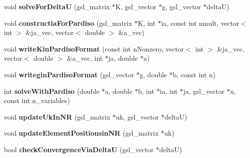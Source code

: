 \begin{DoxyCompactItemize}
\item 
\hypertarget{classSimulation_a23927524ed4ee666bb3f7845b8e5c34f}{}void {\bfseries solve\+For\+Delta\+U} (gsl\+\_\+matrix $\ast$K, gsl\+\_\+vector $\ast$g, gsl\+\_\+vector $\ast$delta\+U)\label{classSimulation_a23927524ed4ee666bb3f7845b8e5c34f}

\item 
\hypertarget{classSimulation_aac47a578fcfe5935eca3fbb9580dc5b0}{}void {\bfseries constructia\+For\+Pardiso} (gsl\+\_\+matrix $\ast$K, int $\ast$ia, const int nmult, vector$<$ int $>$ \&ja\+\_\+vec, vector$<$ double $>$ \&a\+\_\+vec)\label{classSimulation_aac47a578fcfe5935eca3fbb9580dc5b0}

\item 
\hypertarget{classSimulation_a0f0e358f99d5f4a286a464342ab11104}{}void {\bfseries write\+Kin\+Pardiso\+Format} (const int n\+Nonzero, vector$<$ int $>$ \&ja\+\_\+vec, vector$<$ double $>$ \&a\+\_\+vec, int $\ast$ja, double $\ast$a)\label{classSimulation_a0f0e358f99d5f4a286a464342ab11104}

\item 
\hypertarget{classSimulation_ad834b670e7fc5a7933d441d2278d622d}{}void {\bfseries writegin\+Pardiso\+Format} (gsl\+\_\+vector $\ast$g, double $\ast$b, const int n)\label{classSimulation_ad834b670e7fc5a7933d441d2278d622d}

\item 
\hypertarget{classSimulation_acb243ba7dd91cba4e63533ae9b5edd8a}{}int {\bfseries solve\+With\+Pardiso} (double $\ast$a, double $\ast$b, int $\ast$ia, int $\ast$ja, gsl\+\_\+vector $\ast$x, const int n\+\_\+variables)\label{classSimulation_acb243ba7dd91cba4e63533ae9b5edd8a}

\item 
\hypertarget{classSimulation_a938793b4f60eebdd88f7a3a9791819a0}{}void {\bfseries update\+Uk\+In\+N\+R} (gsl\+\_\+matrix $\ast$uk, gsl\+\_\+vector $\ast$delta\+U)\label{classSimulation_a938793b4f60eebdd88f7a3a9791819a0}

\item 
\hypertarget{classSimulation_aed6fc494b468ebd56c07625d3e5984ff}{}void {\bfseries update\+Element\+Positionsin\+N\+R} (gsl\+\_\+matrix $\ast$uk)\label{classSimulation_aed6fc494b468ebd56c07625d3e5984ff}

\item 
\hypertarget{classSimulation_a0bda2f370a66828c5ca3420ddeeb2d4d}{}bool {\bfseries check\+Convergence\+Via\+Delta\+U} (gsl\+\_\+vector $\ast$delta\+U)\label{classSimulation_a0bda2f370a66828c5ca3420ddeeb2d4d}


\end{DoxyCompactItemize}
